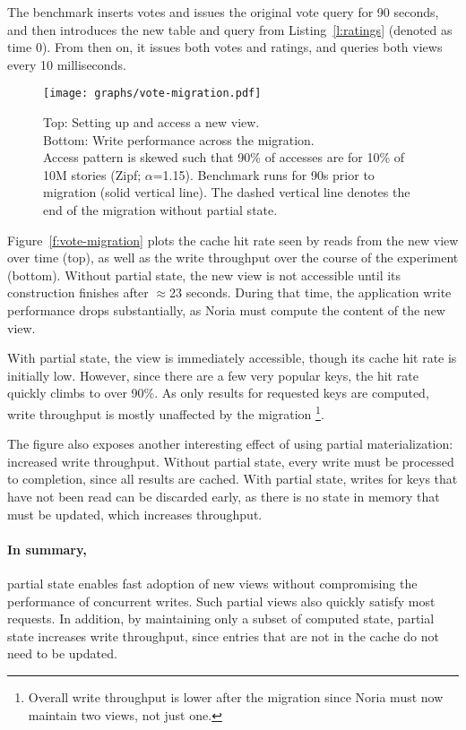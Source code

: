 The benchmark inserts votes and issues the original vote query for 90 seconds,
and then introduces the new table and query from Listing~\ref{l:ratings}
(denoted as time 0). From then on, it issues both votes and ratings, and queries
both views every 10 milliseconds.

\begin{figure}[h]
  \centering
  \texttt{[image: graphs/vote-migration.pdf]}
  \caption{Top: Setting up and access a new view.\\ Bottom: Write performance
  across the migration.\\ Access pattern is skewed such that 90\% of accesses
  are for 10\% of 10M stories (Zipf; $\alpha$=1.15). Benchmark runs for 90s
  prior to migration (solid vertical line). The dashed vertical line denotes the
  end of the migration without partial state.}
  \label{f:vote-migration}
\end{figure}

Figure~\vref{f:vote-migration} plots the cache hit rate seen by reads from the
new view over time (top), as well as the write throughput over the course of the
experiment (bottom). Without partial state, the new view is not accessible until
its construction finishes after $\approx$23 seconds. During that time, the
application write performance drops substantially, as Noria must compute the
content of the new view.

With partial state, the view is immediately accessible, though its cache hit
rate is initially low. However, since there are a few very popular keys, the hit
rate quickly climbs to over 90\%. As only results for requested keys are
computed, write throughput is mostly unaffected by the migration%
\footnote{Overall write throughput is lower after the migration since Noria must
now maintain two views, not just one.}.

The figure also exposes another interesting effect of using partial
materialization: increased write throughput. Without partial state, every write
must be processed to completion, since all results are cached. With partial
state, writes for keys that have not been read can be discarded early, as there
is no state in memory that must be updated, which increases throughput.

\paragraph{In summary,} partial state enables fast adoption of new views without
compromising the performance of concurrent writes. Such partial views also
quickly satisfy most requests. In addition, by maintaining only a subset of
computed state, partial state increases write throughput, since entries that are
not in the cache do not need to be updated.

